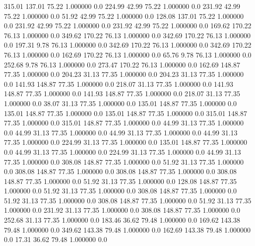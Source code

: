   315.01  137.01   75.22    1.000000    0.0
  224.99   42.99   75.22    1.000000    0.0
  231.92   42.99   75.22    1.000000    0.0
   51.92   42.99   75.22    1.000000    0.0
  128.08  137.01   75.22    1.000000    0.0
  231.92   42.99   75.22    1.000000    0.0
  231.92   42.99   75.22    1.000000    0.0
  169.62  170.22   76.13    1.000000    0.0
  349.62  170.22   76.13    1.000000    0.0
  342.69  170.22   76.13    1.000000    0.0
  197.31    9.78   76.13    1.000000    0.0
  342.69  170.22   76.13    1.000000    0.0
  342.69  170.22   76.13    1.000000    0.0
  162.69  170.22   76.13    1.000000    0.0
   65.76    9.78   76.13    1.000000    0.0
  252.68    9.78   76.13    1.000000    0.0
  273.47  170.22   76.13    1.000000    0.0
  162.69  148.87   77.35    1.000000    0.0
  204.23   31.13   77.35    1.000000    0.0
  204.23   31.13   77.35    1.000000    0.0
  141.93  148.87   77.35    1.000000    0.0
  218.07   31.13   77.35    1.000000    0.0
  141.93  148.87   77.35    1.000000    0.0
  141.93  148.87   77.35    1.000000    0.0
  218.07   31.13   77.35    1.000000    0.0
   38.07   31.13   77.35    1.000000    0.0
  135.01  148.87   77.35    1.000000    0.0
  135.01  148.87   77.35    1.000000    0.0
  135.01  148.87   77.35    1.000000    0.0
  315.01  148.87   77.35    1.000000    0.0
  315.01  148.87   77.35    1.000000    0.0
   44.99   31.13   77.35    1.000000    0.0
   44.99   31.13   77.35    1.000000    0.0
   44.99   31.13   77.35    1.000000    0.0
   44.99   31.13   77.35    1.000000    0.0
  224.99   31.13   77.35    1.000000    0.0
  135.01  148.87   77.35    1.000000    0.0
   44.99   31.13   77.35    1.000000    0.0
  224.99   31.13   77.35    1.000000    0.0
   44.99   31.13   77.35    1.000000    0.0
  308.08  148.87   77.35    1.000000    0.0
   51.92   31.13   77.35    1.000000    0.0
  308.08  148.87   77.35    1.000000    0.0
  308.08  148.87   77.35    1.000000    0.0
  308.08  148.87   77.35    1.000000    0.0
   51.92   31.13   77.35    1.000000    0.0
  128.08  148.87   77.35    1.000000    0.0
   51.92   31.13   77.35    1.000000    0.0
  308.08  148.87   77.35    1.000000    0.0
   51.92   31.13   77.35    1.000000    0.0
  308.08  148.87   77.35    1.000000    0.0
   51.92   31.13   77.35    1.000000    0.0
  231.92   31.13   77.35    1.000000    0.0
  308.08  148.87   77.35    1.000000    0.0
  252.68   31.13   77.35    1.000000    0.0
  183.46   36.62   79.48    1.000000    0.0
  169.62  143.38   79.48    1.000000    0.0
  349.62  143.38   79.48    1.000000    0.0
  162.69  143.38   79.48    1.000000    0.0
   17.31   36.62   79.48    1.000000    0.0
